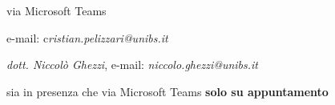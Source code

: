 \begin{frame}
\begin{stepitemize}
\begin{stepitemize}
\begin{stepitemize}
\item via Microsoft Teams

\item e-mail:
\color{light-blue}
c\textit{ristian.pelizzari@unibs.it}%
\color{black}%

\end{stepitemize}

\item \textit{dott. Niccol\`{o} Ghezzi}, e-mail:
\color{light-blue}
\textit{niccolo.ghezzi@unibs.it}%
\color{black}%


sia in presenza che via Microsoft Teams \textbf{solo su appuntamento}
\end{stepitemize}
\end{stepitemize}

%

\transboxout
\end{frame}%
%

